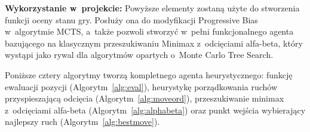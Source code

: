 \documentclass[12pt,a4paper]{article}
\begin{document}
\textbf{Wykorzystanie w~projekcie:} Powyższe elementy zostaną użyte do stworzenia funkcji oceny stanu gry. Posłuży ona do modyfikacji Progressive Bias w~algorytmie MCTS, a~także pozwoli stworzyć w~pełni funkcjonalnego agenta bazującego na klasycznym przeszukiwaniu Minimax z~odcięciami alfa-beta, który wystąpi jako rywal dla algorytmów opartych o~Monte Carlo Tree Search.

Poniższe cztery algorytmy tworzą kompletnego agenta heurystycznego: funkcję ewaluacji pozycji (Algorytm~\ref{alg:eval}), heurystykę porządkowania ruchów przyspieszającą odcięcia (Algorytm~\ref{alg:moveord}), przeszukiwanie minimax z~odcięciami alfa-beta (Algorytm~\ref{alg:alphabeta}) oraz punkt wejścia wybierający najlepszy ruch (Algorytm~\ref{alg:bestmove}).

\end{document}
